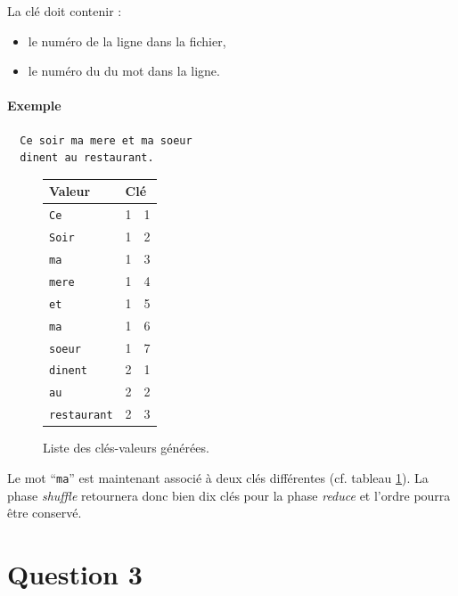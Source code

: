 \documentclass{article}
\begin{document}
      La clé doit contenir : 
      \begin{itemize}
	\item le numéro de la ligne dans la fichier,
        \item le numéro du du mot dans la ligne.
      \end{itemize}

      \paragraph{Exemple}

\begin{verbatim}
  Ce soir ma mere et ma soeur
  dinent au restaurant. 
\end{verbatim}

      \begin{figure}[h]
        \centering
        \begin{tabular}{|l|l|l|}
          \hline {\bf Valeur} & \multicolumn{2}{l|}{\bf Clé} \\
          
          \hline {\tt Ce}         & 1 & 1 \\
          \hline {\tt Soir}       & 1 & 2 \\
          \hline {\tt ma}         & 1 & 3 \\
          \hline {\tt mere}       & 1 & 4 \\
          \hline {\tt et}         & 1 & 5 \\
          \hline {\tt ma}         & 1 & 6 \\
          \hline {\tt soeur}      & 1 & 7 \\
          \hline {\tt dinent}     & 2 & 1 \\
          \hline {\tt au}         & 2 & 2 \\
          \hline {\tt restaurant} & 2 & 3 \\
          \hline
        \end{tabular}
        \caption{Liste des clés-valeurs générées.}
        \label{tab:keys}
      \end{figure}

      Le mot ``{\tt ma}'' est maintenant associé à deux clés différentes
      (cf. tableau \ref{tab:keys}). La phase {\it shuffle} retournera donc bien
      dix clés pour la phase {\it reduce} et l'ordre pourra être conservé.

  \section*{Question 3} 
\end{document}

